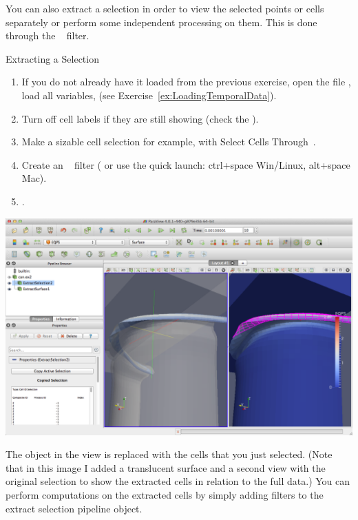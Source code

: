 You can also extract a selection in order to view the selected points or
cells separately or perform some independent processing on them.  This is
done through the ~
filter.

\begin{exercise}{Extracting a Selection}
  \label{ex:ExtractingASelection}%
  \begin{enumerate}
  \item If you do not already have it loaded from the previous exercise,
    open the file , load all variables, \apply (see
    Exercise~\ref{ex:LoadingTemporalData}).
  \item Turn off cell labels if they are still showing (check the
    ).
  \item Make a sizable cell selection for example, with Select Cells
    Through~\selectCellsThrough.
  \item Create an ~
    filter ( \ra {} \ra {} or use the quick launch: ctrl+space Win/Linux, alt+space
    Mac).  
  \item \apply.
  \end{enumerate}

  \begin{inlinefig}
    \includegraphics[width=\scw]{images/ExtractSelection}
  \end{inlinefig}

  The object in the view is replaced with the cells that you just
  selected. (Note that in this image I added a translucent surface and a
  second view with the original selection to show the extracted cells in
  relation to the full data.) You can perform computations on the extracted
  cells by simply adding filters to the extract selection pipeline object.
\end{exercise}

